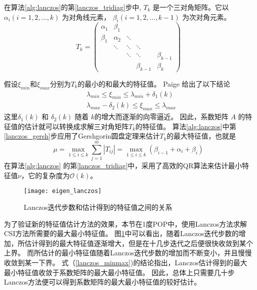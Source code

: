 在算法\ref{alg:lanczos}的第\ref{lanczos_tridiag}步中, $T_k$ 是一个三对角矩阵。它以 $\alpha_i (i=1,2,...,k)$ 为对角线元素， $\beta_i (i=1,2,...,k-1)$ 为次对角元素。 
\[ T_{k} = \left(\begin{array}{ccccc}
\alpha_1 & \beta_1  &  &&  \\
\beta_1 & \alpha_2  & \ddots &&  \\
  & \ddots & \ddots & \ddots&  \\
  &    &\ddots  &\ddots& \beta_{k-1} \\
 &    &  &\beta_{k-1}& \beta_{k} 
\end{array} \right)\]

假设$\xi_{min}$和$\xi_{max}$分别为$T_k$的最小的和最大的特征值。
Paige\cite{Paige1980235} 给出了以下结论
\begin{equation}\label{lanczos_minmax}
\begin{aligned} 
&\lambda_{min} \le \xi_{min} \le \lambda_{min}+\delta_1(k) \\
&\lambda_{max}-\delta_2(k)  \le \xi_{max} \le \lambda_{max}
\end{aligned}
\end{equation}
这里$\delta_1(k)$ 和 $\delta_2(k)$ 随着 $k$的增大而逐渐的向零逼近。 因此，系数矩阵 $A$ 的特征值的估计就可以转换成求解三对角矩阵$T_k$的特征值。 
算法\ref{alg:lanczos}中第\ref{lanczos_gersh}步应用了Gershgorin圆盘定理来估计$T_k$的最大特征值，也就是 
\begin{equation}
\mu = \max_{1 \le i \le k}\sum^m_{j=1}|T_{ij}|=\max_{1 \le i \le k}(\beta_{i-1}+\alpha_i +\beta_{i})
\end{equation}
在算法\ref{alg:lanczos} 的第\ref{lanczos_tridiag}中，采用了高效的QR算法\cite{ortega1963llt}来估计最小特征值$\nu$，它的复杂度为$\mathcal{O}(k)$。
 
\begin {figure}[ht]
\centering
\texttt{[image: eigen\_lanczos]}
\caption[] {Lanczos迭代步数和估计得到的特征值之间的关系\label{fig:lanczos_eigs}}
\end{figure}
  
为了验证新的特征值估计方法的效果，本节在1度POP中，使用Lanczos方法求解CSI方法所需要的最大最小特征值。 
图\ref{fig:lanczos_eigs}中可以看出，随着Lanczos迭代步数的增加，所估计得到的最大特征值逐渐增大，但是在十几步迭代之后便很快收敛到某个上界。
而所估计的最小特征值随着Lanczos迭代步数的增加而不断变小，并且慢慢收敛到某一下界。 
式（\ref{lanczos_minmax})的结论指出，Lanczos估计得到的最大最小特征值收敛于系数矩阵的最大最小特征值。
因此，总体上只需要几十步Lanczos方法便可以得到系数矩阵的最大最小特征值的较好估计。


